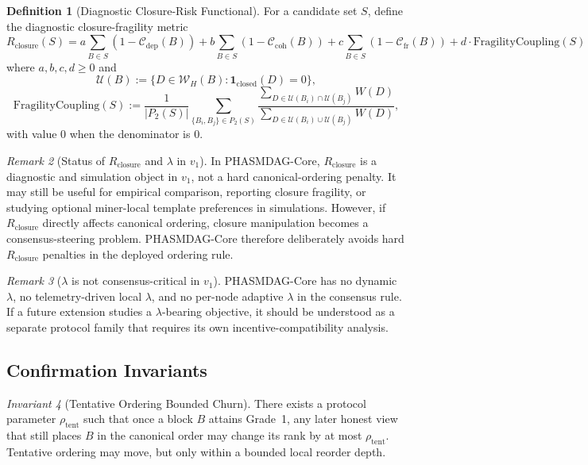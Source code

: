 \documentclass[11pt]{article}
\theoremstyle{definition}
\newtheorem{definition}{Definition}[section]
\theoremstyle{plain}
\theoremstyle{remark}
\newtheorem{remark}[definition]{Remark}
\newtheorem{invariant}[definition]{Invariant}
\newcommand{\Cdep}{\mathcal{C}_{\mathrm{dep}}}
\newcommand{\Ccoh}{\mathcal{C}_{\mathrm{coh}}}
\newcommand{\Cfr}{\mathcal{C}_{\mathrm{fr}}}
\newcommand{\Rcls}{R_{\mathrm{closure}}} %
\newcommand{\Frag}{\mathrm{FragilityCoupling}}
\begin{document}
\begin{definition}[Diagnostic Closure-Risk Functional]\label{def:rclosure}
For a candidate set $S$, define the diagnostic closure-fragility metric
\begin{equation}\label{eq:rclosure}
\Rcls(S) =
a\sum_{B\in S}(1-\Cdep(B))
{}+ b\sum_{B\in S}(1-\Ccoh(B))
{}+ c\sum_{B\in S}(1-\Cfr(B))
{}+ d\cdot \Frag(S)
\end{equation}
where $a,b,c,d \ge 0$ and
\begin{equation}\label{eq:unresolved_set}
\mathcal{U}(B) :=
\{D \in \mathcal{W}_H(B) : \mathbf{1}_{\mathrm{closed}}(D)=0\},
\end{equation}
\begin{equation}\label{eq:fragility_coupling}
\Frag(S)
:=
\frac{1}{|P_2(S)|}
\sum_{\{B_i,B_j\}\in P_2(S)}
\frac{\sum_{D \in \mathcal{U}(B_i)\cap \mathcal{U}(B_j)} W(D)}
{\sum_{D \in \mathcal{U}(B_i)\cup \mathcal{U}(B_j)} W(D)},
\end{equation}
with value $0$ when the denominator is $0$.
\end{definition}

\begin{remark}[Status of $\Rcls$ and $\lambda$ in $v_1$]\label{rem:rclosure_audit}
In PHASMDAG-Core, $\Rcls$ is a diagnostic and simulation object in $v_1$, not
a hard canonical-ordering penalty.
It may still be useful for empirical comparison, reporting closure fragility,
or studying optional miner-local template preferences in simulations.
However, if $\Rcls$ directly affects canonical ordering, closure manipulation
becomes a consensus-steering problem.
PHASMDAG-Core therefore deliberately avoids hard $\Rcls$ penalties in the
deployed ordering rule.
\end{remark}

\begin{remark}[$\lambda$ is not consensus-critical in $v_1$]\label{rem:lambda}
PHASMDAG-Core has no dynamic $\lambda$, no telemetry-driven local $\lambda$,
and no per-node adaptive $\lambda$ in the consensus rule.
If a future extension studies a $\lambda$-bearing objective, it should be
understood as a separate protocol family that requires its own
incentive-compatibility analysis.
\end{remark}

\subsection{Confirmation Invariants}

\begin{invariant}[Tentative Ordering Bounded Churn]\label{inv:tentative}
There exists a protocol parameter $\rho_{\mathrm{tent}}$ such that once a block
$B$ attains Grade~1, any later honest view that still places $B$ in the
canonical order may change its rank by at most $\rho_{\mathrm{tent}}$.
Tentative ordering may move, but only within a bounded local reorder depth.
\end{invariant}
\end{document}
